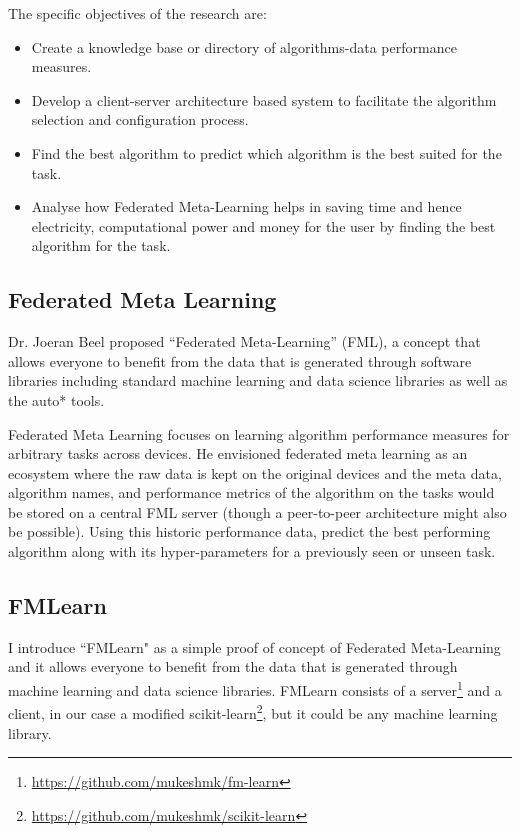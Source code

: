 The specific objectives of the research are:

\begin{itemize}
    \item Create a knowledge base or directory of algorithms-data performance measures.
    \item Develop a client-server architecture based system to facilitate the algorithm selection and configuration process.
    \item Find the best algorithm to predict which algorithm is the best suited for the task.
    \item Analyse how Federated Meta-Learning helps in saving time and hence electricity, computational power and money for the user by finding the best algorithm for the task.
\end{itemize}

\subsection{Federated Meta Learning}
Dr. Joeran Beel proposed “Federated Meta-Learning” (FML), a concept that allows everyone to benefit from the data that is generated through software libraries including standard machine learning and data science libraries as well as the auto* tools. 

Federated Meta Learning focuses on learning algorithm performance measures for arbitrary tasks across devices. He envisioned federated meta learning as an ecosystem where the raw data is kept on the original  devices and the meta data, algorithm names, and performance metrics of the algorithm on the tasks would be stored on a central FML server (though a peer-to-peer architecture might also be possible). Using this historic performance data, predict the best performing algorithm along with its hyper-parameters for a previously seen or unseen task.

\subsection{FMLearn}
I introduce “FMLearn" as a simple proof of concept of Federated Meta-Learning and it allows everyone to benefit from the data that is generated through machine learning and data science libraries. FMLearn consists of a server\footnote{\url{https://github.com/mukeshmk/fm-learn}} and a client, in our case a modified scikit-learn\footnote{\url{https://github.com/mukeshmk/scikit-learn}}, but it could be any machine learning library.

